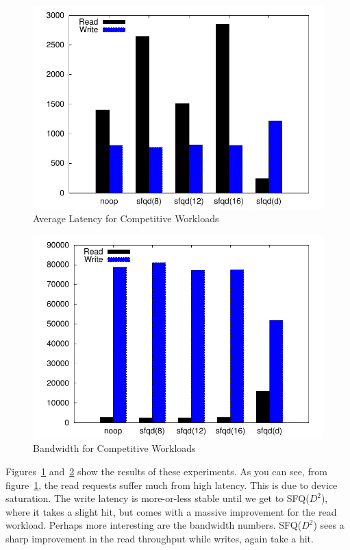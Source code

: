 \begin{figure}[t]
  \centering \includegraphics[width=\linewidth]{../../graphs/against/latency_against.pdf}
  \caption{Average Latency for Competitive Workloads}
  \label{fig:latAgs}
\end{figure} 

\begin{figure}[t]
  \centering \includegraphics[width=\linewidth]{../../graphs/against/bandwidth_against.pdf}
  \caption{Bandwidth for Competitive Workloads}
  \label{fig:bandAgs}
\end{figure}

Figures~\ref{fig:latAgs} and~\ref{fig:bandAgs} show the results of
these experiments. As you can see, from figure~\ref{fig:latAgs}, the
read requests suffer much from high latency. This is due to device
saturation. The write latency is more-or-less stable until we get to
SFQ($D^2$), where it takes a slight hit, but comes with a massive
improvement for the read workload. Perhaps more interesting are the
bandwidth numbers. SFQ($D^2$) sees a sharp improvement in the read
throughput while writes, again take a hit. 

